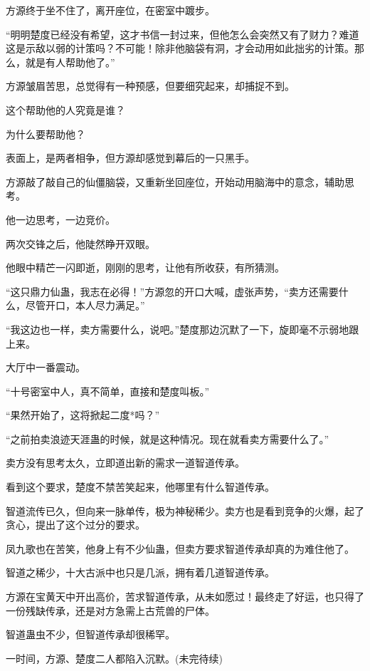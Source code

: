 \begin{this_body}
方源终于坐不住了，离开座位，在密室中踱步。

“明明楚度已经没有希望，这才书信一封过来，但他怎么会突然又有了财力？难道这是示敌以弱的计策吗？不可能！除非他脑袋有洞，才会动用如此拙劣的计策。那么，就是有人帮助他了。”

方源皱眉苦思，总觉得有一种预感，但要细究起来，却捕捉不到。

这个帮助他的人究竟是谁？

为什么要帮助他？

表面上，是两者相争，但方源却感觉到幕后的一只黑手。

方源敲了敲自己的仙僵脑袋，又重新坐回座位，开始动用脑海中的意念，辅助思考。

他一边思考，一边竞价。

两次交锋之后，他陡然睁开双眼。

他眼中精芒一闪即逝，刚刚的思考，让他有所收获，有所猜测。

“这只鼎力仙蛊，我志在必得！”方源忽的开口大喊，虚张声势，“卖方还需要什么，尽管开口，本人尽力满足。”

“我这边也一样，卖方需要什么，说吧。”楚度那边沉默了一下，旋即毫不示弱地跟上来。

大厅中一番震动。

“十号密室中人，真不简单，直接和楚度叫板。”

“果然开始了，这将掀起二度*吗？”

“之前拍卖浪迹天涯蛊的时候，就是这种情况。现在就看卖方需要什么了。”

卖方没有思考太久，立即道出新的需求一道智道传承。

看到这个要求，楚度不禁苦笑起来，他哪里有什么智道传承。

智道流传已久，但向来一脉单传，极为神秘稀少。卖方也是看到竞争的火爆，起了贪心，提出了这个过分的要求。

凤九歌也在苦笑，他身上有不少仙蛊，但卖方要求智道传承却真的为难住他了。

智道之稀少，十大古派中也只是几派，拥有着几道智道传承。

方源在宝黄天中开出高价，苦求智道传承，从未如愿过！最终走了好运，也只得了一份残缺传承，还是对方急需上古荒兽的尸体。

智道蛊虫不少，但智道传承却很稀罕。

一时间，方源、楚度二人都陷入沉默。(未完待续)

\end{this_body}

